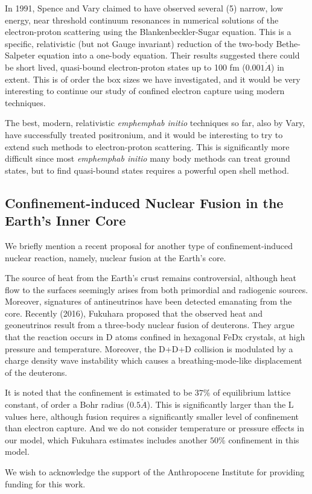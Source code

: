 \documentclass[%
 aip,
 jmp,%
 amsmath,amssymb,
 reprint,%
]{revtex4-1}
\begin{document}
In 1991, Spence and Vary claimed to have observed several (5) narrow, low energy, near threshold continuum resonances in numerical solutions of the electron-proton scattering using the Blankenbeckler-Sugar equation\cite{SPENCE199127}.  This is a specific, relativistic (but not Gauge invariant) reduction of the two-body Bethe-Salpeter equation into a one-body equation. Their results suggested there could be short lived, quasi-bound electron-proton states up to 100 fm ($0.001\mathring{A}$) in extent.  This is of order the box sizes we have investigated, and it would be very interesting to continue our study of confined electron capture using modern techniques.  

The best, modern, relativistic \emph{emph{emph{ab initio}}} techniques so far, also by Vary, have successfully treated positronium,\cite{positroniumQFT} and it would be interesting to try to extend such methods to electron-proton scattering. This is significantly more difficult since most \emph{emph{emph{ab initio}}} many body methods can treat ground states, but to find quasi-bound states  requires a powerful open shell method.

\subsection{Confinement-induced Nuclear Fusion in the Earth's Inner Core}

We briefly mention a recent proposal for another type of  confinement-induced nuclear reaction,
namely, nuclear fusion at the Earth's core.

The source of heat from the Earth's crust remains controversial, although heat flow
to the surfaces seemingly arises from both primordial and radiogenic sources.
Moreover, signatures of antineutrinos have been detected emanating from the core.
Recently (2016), Fukuhara proposed that the observed heat and geoneutrinos
result from a three-body nuclear fusion of deuterons.\cite{fukuhara}  They argue that
the reaction occurs in D atoms confined in hexagonal FeDx crystals, at high pressure
and temperature.  Moreover, the D+D+D collision is modulated by a charge density wave
instability which causes a breathing-mode-like displacement of the deuterons.

It is noted that the confinement is estimated to be $37\%$ of equilibrium lattice constant,
of order a Bohr radius ($0.5\mathring{A}$).  This is significantly larger than the L values here,
although fusion requires a significantly smaller level of confinement than electron capture.
And we do not consider temperature or pressure effects in our model, which Fukuhara
estimates includes another $50\%$ confinement in this model.

\begin{acknowledgments}
We wish to acknowledge the support of the Anthropocene Institute for providing funding for this work.

\end{acknowledgments}
\end{document}
